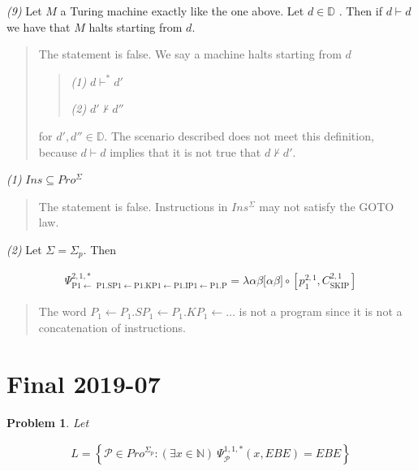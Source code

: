 \documentclass[a4paper, 12pt]{article}
\newtheorem{problem}{Problem}
\newtheorem{problem}{Problem}
\begin{document}
\textit{(9)} Let $M$ a Turing machine exactly like the one above. Let $d \in
\mathbb{D}$ . Then if $d \vdash d$ we have that $M$ halts starting from $d$.


\small
\begin{quote}

    The statement is false. We say a machine halts starting from $d$ 

    \begin{quote}
        \textit{(1)} $d \vdash^{*} d'$ 

        \textit{(2)} $d' \not\vdash d''$
    \end{quote}

    for $d', d'' \in \mathbb{D}$. The scenario described does not meet this
    definition, because $d \vdash d$ implies that it is not true that $d
    \not\vdash d'$.
\end{quote}
\normalsize


\pagebreak 

\textit{(1)} $Ins \subseteq Pro^{\Sigma}$


\small
\begin{quote}

    The statement is false. Instructions in $Ins^{\Sigma}$ may not satisfy the
    GOTO law.

\end{quote}
\normalsize


\textit{(2)} Let $\Sigma = \Sigma_p$. Then 

\begin{align*}
    \Psi _{\text{P1}\leftarrow \text{ P1.SP1}\leftarrow \text{P1.KP1}\leftarrow \text{P1.IP1}\leftarrow \text{P1.P} }^{2,1,\ast }=\lambda \alpha \beta \lbrack \alpha \beta ]\circ \left[ p_{1}^{2,1},C_{\mathrm{SKIP}}^{2,1}\right]
\end{align*}


\small
\begin{quote}

The word $P_1 \leftarrow  P_1.SP_1 \leftarrow P_1.KP_1 \leftarrow \ldots$ is not
a program since it is not a concatenation of instructions. 

\end{quote}
\normalsize

\pagebreak 

\section{Final 2019-07}

\begin{problem}
Let 

\begin{align*} L = \left\{ \mathcal{P} \in Pro^{\Sigma_p} : (\exists x \in
\mathbb{N}) ~ \Psi_{\mathcal{P}}^{1, 1, *}(x, EBE) = EBE \right\} \end{align*}
\end{problem}
\end{document}
